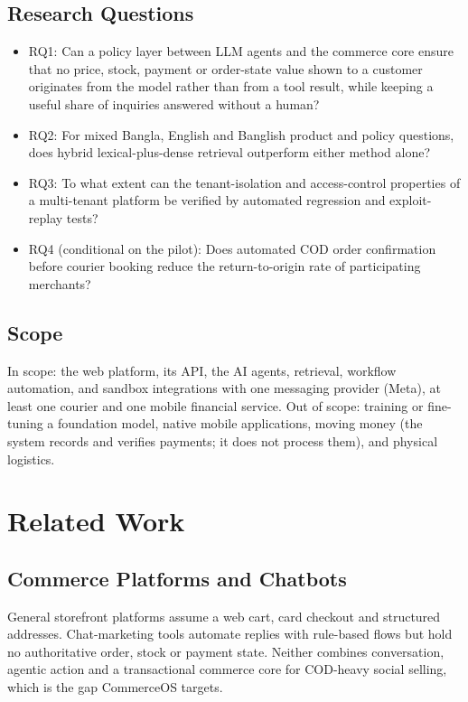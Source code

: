 \documentclass[conference,a4paper]{IEEEtran}
\begin{document}
\subsection{Research Questions}
\begin{itemize}
\item RQ1: Can a policy layer between LLM agents and the commerce core ensure that no price, stock, payment or order-state value shown to a customer originates from the model rather than from a tool result, while keeping a useful share of inquiries answered without a human?
\item RQ2: For mixed Bangla, English and Banglish product and policy questions, does hybrid lexical-plus-dense retrieval outperform either method alone?
\item RQ3: To what extent can the tenant-isolation and access-control properties of a multi-tenant platform be verified by automated regression and exploit-replay tests?
\item RQ4 (conditional on the pilot): Does automated COD order confirmation before courier booking reduce the return-to-origin rate of participating merchants?
\end{itemize}

\subsection{Scope}
In scope: the web platform, its API, the AI agents, retrieval, workflow automation, and sandbox integrations with one messaging provider (Meta), at least one courier and one mobile financial service. Out of scope: training or fine-tuning a foundation model, native mobile applications, moving money (the system records and verifies payments; it does not process them), and physical logistics.


\section{Related Work}
\subsection{Commerce Platforms and Chatbots}
General storefront platforms assume a web cart, card checkout and structured addresses. Chat-marketing tools automate replies with rule-based flows but hold no authoritative order, stock or payment state. Neither combines conversation, agentic action and a transactional commerce core for COD-heavy social selling, which is the gap CommerceOS targets.
\end{document}
